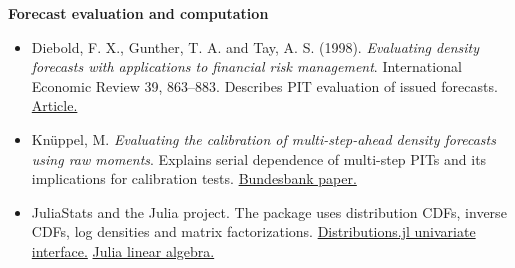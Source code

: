 \documentclass[11pt,letterpaper]{article}
\newcommand{\lead}[1]{\textbf{\textcolor{accent}{#1}}}
\newcommand{\src}[2]{\href{#1}{#2}}
\begin{document}
\lead{Forecast evaluation and computation}
\begin{itemize}\setlength{\itemsep}{3pt}
\item Diebold, F. X., Gunther, T. A. and Tay, A. S. (1998). \emph{Evaluating density forecasts with applications to financial risk management}. International Economic Review 39, 863--883. Describes PIT evaluation of issued forecasts. \src{https://users.ssc.wisc.edu/~behansen/718/DieboldGuntherTay1998.pdf}{Article.}
\item Kn\"uppel, M. \emph{Evaluating the calibration of multi-step-ahead density forecasts using raw moments}. Explains serial dependence of multi-step PITs and its implications for calibration tests. \src{https://www.bundesbank.de/resource/blob/635436/766e285ef812d86d49c02dd8033d7333/472B63F073F071307366337C94F8C870/2012-06-01-eltville-02-knueppel-paper-data.pdf}{Bundesbank paper.}
\item JuliaStats and the Julia project. The package uses distribution CDFs, inverse CDFs, log densities and matrix factorizations. \src{https://juliastats.org/Distributions.jl/stable/univariate/}{Distributions.jl univariate interface.} \src{https://docs.julialang.org/en/v1/stdlib/LinearAlgebra/}{Julia linear algebra.}
\end{itemize}
\end{document}
